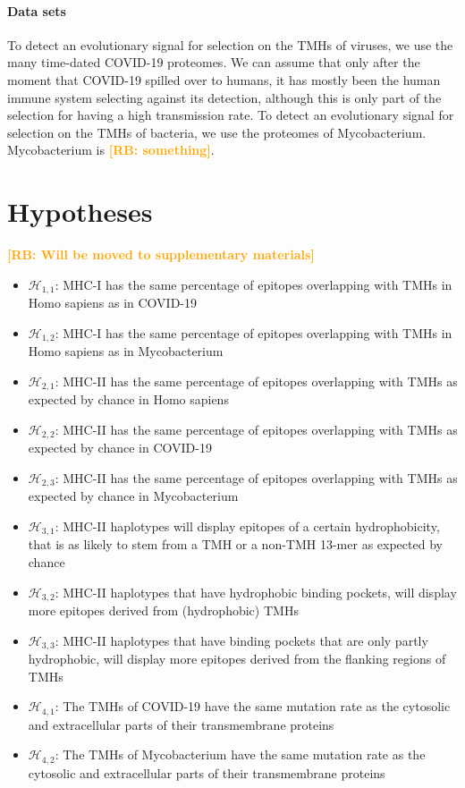 \documentclass{article}
\newcommand{\richel}[1]{\textcolor{orange}{\textbf{[RB: #1]}}}
\begin{document}
\paragraph{Data sets}


To detect an evolutionary signal for selection on the TMHs of viruses, 
we use the many time-dated COVID-19 proteomes.
We can assume that only after the moment that COVID-19 spilled over 
to humans, it has mostly been the human immune system selecting against
its detection, although this is only part of the selection for 
having a high transmission rate.
To detect an evolutionary signal for selection on the TMHs of bacteria, 
we use the proteomes of Mycobacterium. Mycobacterium is \richel{something}.


\section{Hypotheses}

\richel{Will be moved to supplementary materials}

\begin{itemize}
  \item $\mathcal{H}_{1,1}$: MHC-I has the same percentage of epitopes overlapping
    with TMHs in Homo sapiens as in COVID-19
  \item $\mathcal{H}_{1,2}$: MHC-I has the same percentage of epitopes overlapping
    with TMHs in Homo sapiens as in Mycobacterium
  \item $\mathcal{H}_{2,1}$: MHC-II has the same percentage of epitopes overlapping
    with TMHs as expected by chance in Homo sapiens
  \item $\mathcal{H}_{2,2}$: MHC-II has the same percentage of epitopes overlapping
    with TMHs as expected by chance in COVID-19
  \item $\mathcal{H}_{2,3}$: MHC-II has the same percentage of epitopes overlapping
    with TMHs as expected by chance in Mycobacterium
  \item $\mathcal{H}_{3,1}$: MHC-II haplotypes will display epitopes
    of a certain hydrophobicity, that is as likely to stem from
    a TMH or a non-TMH 13-mer as expected by chance
  \item $\mathcal{H}_{3,2}$: MHC-II haplotypes that have hydrophobic
    binding pockets, will display more epitopes derived from (hydrophobic)
    TMHs
  \item $\mathcal{H}_{3,3}$: MHC-II haplotypes that have binding pockets
    that are only partly hydrophobic, will display more epitopes derived 
    from the flanking regions of TMHs
  \item $\mathcal{H}_{4,1}$: The TMHs of COVID-19
    have the same mutation rate 
    as the cytosolic and extracellular parts of their transmembrane proteins
  \item $\mathcal{H}_{4,2}$: The TMHs of Mycobacterium
    have the same mutation rate 
    as the cytosolic and extracellular parts of their transmembrane proteins
\end{itemize}
\end{document}
